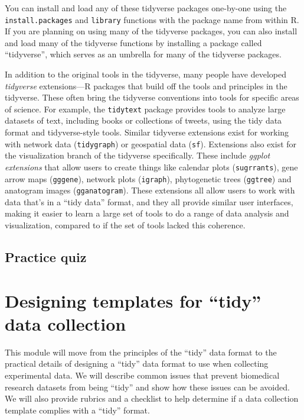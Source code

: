 \documentclass[]{tufte-book}
\begin{document}
You can install and load any of these tidyverse packages one-by-one using the
\texttt{install.packages} and \texttt{library} functions with the package name from within R.
If you are planning on using many of the tidyverse packages, you can also
install and load many of the tidyverse functions by installing a package called
``tidyverse'', which serves as an umbrella for many of the tidyverse packages.

In addition to the original tools in the tidyverse, many people have developed
\emph{tidyverse} extensions---R packages that build off the tools and principles in
the tidyverse. These often bring the tidyverse conventions into tools for
specific areas of science. For example, the \texttt{tidytext} package provides tools to
analyze large datasets of text, including books or collections of tweets, using
the tidy data format and tidyverse-style tools. Similar tidyverse extensions
exist for working with network data (\texttt{tidygraph}) or geospatial data (\texttt{sf}).
Extensions also exist for the visualization branch of the tidyverse
specifically. These include \emph{ggplot extensions} that allow users to create
things like calendar plots (\texttt{sugrrants}), gene arrow maps (\texttt{gggene}), network
plots (\texttt{igraph}), phytogenetic trees (\texttt{ggtree}) and anatogram images
(\texttt{gganatogram}). These extensions all allow users to work with data that's in a
``tidy data'' format, and they all provide similar user interfaces, making it
easier to learn a large set of tools to do a range of data analysis and
visualization, compared to if the set of tools lacked this coherence.

\hypertarget{practice-quiz}{%
\subsection{Practice quiz}\label{practice-quiz}}

\hypertarget{designing-templates-for-tidy-data-collection}{%
\section{Designing templates for ``tidy'' data collection}\label{designing-templates-for-tidy-data-collection}}

This module will move from the principles of the ``tidy'' data format to the
practical details of designing a ``tidy'' data format to use when collecting
experimental data. We will describe common issues that prevent biomedical
research datasets from being ``tidy'' and show how these issues can be avoided. We
will also provide rubrics and a checklist to help determine if a data collection
template complies with a ``tidy'' format.
\end{document}
